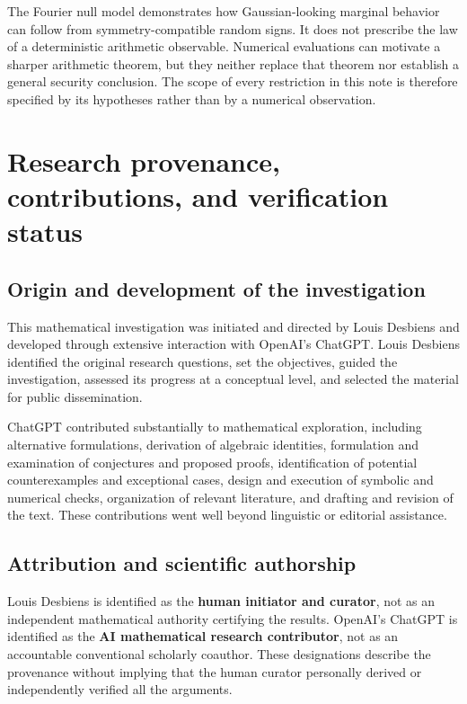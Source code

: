 \documentclass[
  11pt,
  a4paper,
]{article}
\begin{document}
The Fourier null model demonstrates how Gaussian-looking marginal
behavior can follow from symmetry-compatible random signs. It does not
prescribe the law of a deterministic arithmetic observable. Numerical
evaluations can motivate a sharper arithmetic theorem, but they neither
replace that theorem nor establish a general security conclusion. The
scope of every restriction in this note is therefore specified by its
hypotheses rather than by a numerical observation.

\section{Research provenance, contributions, and verification
status}\label{research-provenance-contributions-and-verification-status}

\subsection{Origin and development of the
investigation}\label{origin-and-development-of-the-investigation}

This mathematical investigation was initiated and directed by Louis
Desbiens and developed through extensive interaction with OpenAI's
ChatGPT. Louis Desbiens identified the original research questions, set
the objectives, guided the investigation, assessed its progress at a
conceptual level, and selected the material for public dissemination.

ChatGPT contributed substantially to mathematical exploration, including
alternative formulations, derivation of algebraic identities,
formulation and examination of conjectures and proposed proofs,
identification of potential counterexamples and exceptional cases,
design and execution of symbolic and numerical checks, organization of
relevant literature, and drafting and revision of the text. These
contributions went well beyond linguistic or editorial assistance.

\subsection{Attribution and scientific
authorship}\label{attribution-and-scientific-authorship}

Louis Desbiens is identified as the \textbf{human initiator and
curator}, not as an independent mathematical authority certifying the
results. OpenAI's ChatGPT is identified as the \textbf{AI mathematical
research contributor}, not as an accountable conventional scholarly
coauthor. These designations describe the provenance without implying
that the human curator personally derived or independently verified all
the arguments.
\end{document}
